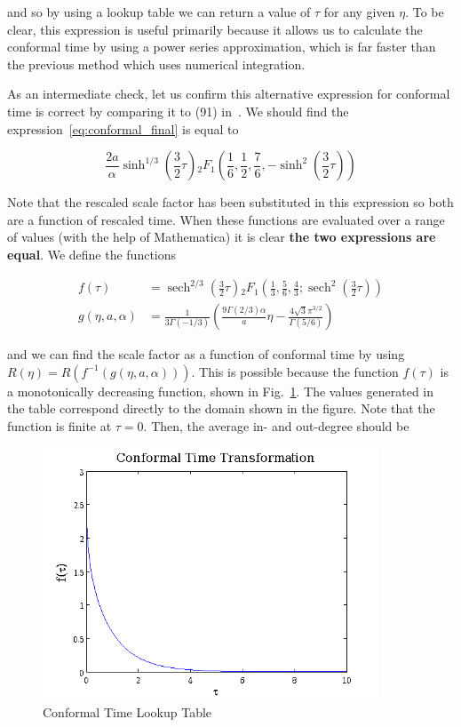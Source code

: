 \documentclass[preprint,notitlepage,amsmath,amssymb,floatfix]{revtex4-1}
\DeclareMathOperator{\sech}{sech}
\begin{document}
\noindent and so by using a lookup table we can return a value of $\tau$ for any given $\eta$.
To be clear, this expression is useful primarily because it allows us to calculate the conformal time by using a power series approximation, which is far faster than the previous method which uses numerical integration. \par
As an intermediate check, let us confirm this alternative expression for conformal time is correct by comparing it to (91) in~\cite{ref:snc2012}.
We should find the expression~\eqref{eq:conformal_final} is equal to

\begin{equation}
\frac{2a}{\alpha}\sinh^{1/3}\left(\frac{3}{2}\tau\right) {}_2F_1\left(\frac{1}{6},\frac{1}{2},\frac{7}{6},-\sinh^2\left(\frac{3}{2}\tau\right)\right)
\end{equation}

\noindent Note that the rescaled scale factor has been substituted in this expression so both are a function of rescaled time.
When these functions are evaluated over a range of values (with the help of Mathematica) it is clear \textbf{the two expressions are equal}.
We define the functions

\begin{align}
f\left(\tau\right) &= \sech^{2/3}\left(\frac{3}{2}\tau\right) {}_2F_1\left(\frac{1}{3},\frac{5}{6},\frac{4}{3};\sech^2\left(\frac{3}{2}\tau\right)\right) \\
g\left(\eta, a, \alpha\right) &= \frac{1}{3\Gamma\left(-1/3\right)}\left(\frac{9\Gamma\left(2/3\right)\alpha}{a}\eta - \frac{4\sqrt{3}\pi^{3/2}}{\Gamma\left(5/6\right)}\right)
\end{align}

\noindent and we can find the scale factor as a function of conformal time by using $R\left(\eta\right) = R\left(f^{-1}\left(g\left(\eta, a, \alpha\right)\right)\right)$.
This is possible because the function $f\left(\tau\right)$ is a monotonically decreasing function, shown in Fig.~\ref{fig:f_tau_tau}.
The values generated in the table correspond directly to the domain shown in the figure.
Note that the function is finite at $\tau = 0$.
Then, the average in- and out-degree should be

\begin{figure}
\includegraphics[width=10cm]{figures/ctuc.png}
\caption{Conformal Time Lookup Table}
\label{fig:f_tau_tau}
\centering
\end{figure}
\end{document}
